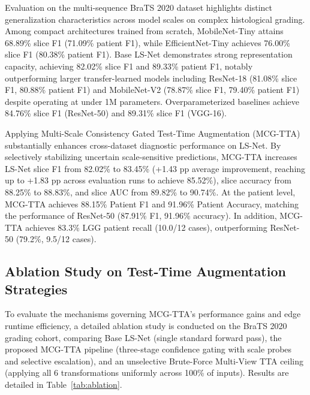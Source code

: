 \documentclass[journal]{IEEEtran}
\begin{document}
Evaluation on the multi-sequence BraTS 2020 dataset highlights distinct generalization characteristics across model scales on complex histological grading. Among compact architectures trained from scratch, MobileNet-Tiny attains 68.89\% slice F1 (71.09\% patient F1), while EfficientNet-Tiny achieves 76.00\% slice F1 (80.38\% patient F1). Base LS-Net demonstrates strong representation capacity, achieving 82.02\% slice F1 and 89.33\% patient F1, notably outperforming larger transfer-learned models including ResNet-18 (81.08\% slice F1, 80.88\% patient F1) and MobileNet-V2 (78.87\% slice F1, 79.40\% patient F1) despite operating at under 1M parameters. Overparameterized baselines achieve 84.76\% slice F1 (ResNet-50) and 89.31\% slice F1 (VGG-16).

Applying Multi-Scale Consistency Gated Test-Time Augmentation (MCG-TTA) substantially enhances cross-dataset diagnostic performance on LS-Net. By selectively stabilizing uncertain scale-sensitive predictions, MCG-TTA increases LS-Net slice F1 from 82.02\% to 83.45\% (+1.43 pp average improvement, reaching up to +1.83 pp across evaluation runs to achieve 85.52\%), slice accuracy from 88.25\% to 88.83\%, and slice AUC from 89.82\% to 90.74\%. At the patient level, MCG-TTA achieves 88.15\% Patient F1 and 91.96\% Patient Accuracy, matching the performance of ResNet-50 (87.91\% F1, 91.96\% accuracy). In addition, MCG-TTA achieves 83.3\% LGG patient recall (10.0/12 cases), outperforming ResNet-50 (79.2\%, 9.5/12 cases).

\subsection{Ablation Study on Test-Time Augmentation Strategies}

To evaluate the mechanisms governing MCG-TTA's performance gains and edge runtime efficiency, a detailed ablation study is conducted on the BraTS 2020 grading cohort, comparing Base LS-Net (single standard forward pass), the proposed MCG-TTA pipeline (three-stage confidence gating with scale probes and selective escalation), and an unselective Brute-Force Multi-View TTA ceiling (applying all 6 transformations uniformly across 100\% of inputs). Results are detailed in Table~\ref{tab:ablation}.
\end{document}
